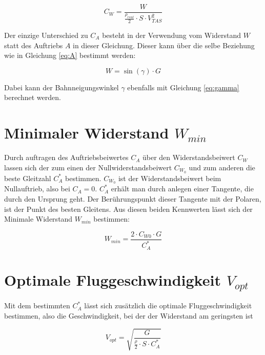 \begin{equation}
C_W=\frac{W}{\frac{\rho_{real}}{2} \cdot S \cdot V_{TAS}^2}
\end{equation}

Der einzige Unterschied zu $C_A$ besteht in der Verwendung vom Widerstand $W$ statt des Auftriebs $A$ in dieser Gleichung. Dieser kann über die selbe Beziehung wie in Gleichung \ref{eq:A} bestimmt werden:

\begin{equation}
W=\sin(\gamma) \cdot G
\end{equation}

Dabei kann der Bahnneigungswinkel $\gamma$ ebenfalls mit Gleichung \ref{eq:gamma} berechnet werden.

\section{Minimaler Widerstand $W_{min}$}

Durch auftragen des Auftriebsbeiwertes $C_A$ über den Widerstandsbeiwert $C_W$ lassen sich der zum einen der Nullwiderstandsbeiwert $C_W_0$ und zum anderen die beste Gleitzahl $C_A^*$ bestimmen. $C_W_0$ ist der Widerstandsbeiwert beim Nullauftrieb, also bei $C_A=0$. $C_A^*$ erhält man durch anlegen einer Tangente, die durch den Ursprung geht. Der Berührungspunkt dieser Tangente mit der Polaren, ist der Punkt des besten Gleitens. Aus diesen beiden Kennwerten lässt sich der Minimale Widerstand $W_{min}$ bestimmen:

\begin{equation}
W_{min}=\frac{2 \cdot C_{W0} \cdot G}{C_A^*}
\label{eq:W_min}
\end{equation}

\section{Optimale Fluggeschwindigkeit $V_{opt}$}

Mit dem bestimmten $C_A^*$ lässt sich zusätzlich die optimale Fluggeschwindigkeit bestimmen, also die Geschwindigkeit, bei der der Widerstand am geringsten ist

\begin{equation}
V_{opt}=\sqrt{\frac{G}{\frac{\rho}{2} \cdot S \cdot C_A^*}}
\label{eq:V_opt}
\end{equation}



